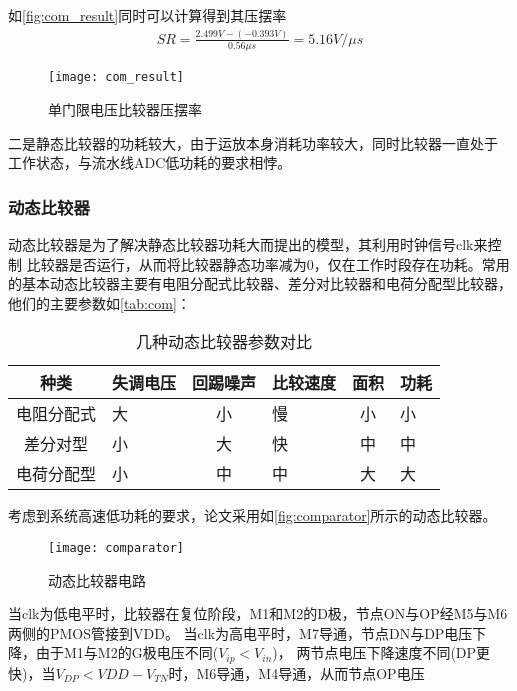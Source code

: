     \par 如\autoref{fig:com_result}同时可以计算得到其压摆率
    \begin{align}
        SR = \frac{2.499V-(-0.393V)}{0.56\mu s} = 5.16V/\mu s
    \end{align}
    \begin{figure}[H]
        \centering
        \texttt{[image: com\_result]}
        \caption{\label{fig:com_result}单门限电压比较器压摆率}
    \end{figure}

    \par 二是静态比较器的功耗较大，由于运放本身消耗功率较大，同时比较器一直处于
    工作状态，与流水线ADC低功耗的要求相悖。
    \subsubsection{动态比较器}
    动态比较器是为了解决静态比较器功耗大而提出的模型，其利用时钟信号clk来控制
    比较器是否运行，从而将比较器静态功率减为0，仅在工作时段存在功耗。常用
    的基本动态比较器主要有电阻分配式比较器、差分对比较器和电荷分配型比较器，
    他们的主要参数如\autoref{tab:com}：
    \begin{table}[ht]
        \caption{\label{tab:com}几种动态比较器参数对比}
        \begin{tabularx}{\linewidth}{|c|X<{\centering}|c|X<{\centering}|c|X<{\centering}|}
            \hline
            种类 & 失调电压 & 回踢噪声 & 比较速度 & 面积 & 功耗\\ \hline
            电阻分配式 & 大 & 小 & 慢 & 小 & 小\\ \hline
            差分对型 & 小 & 大 & 快 & 中 & 中\\ \hline
            电荷分配型 & 小 & 中 & 中 & 大 & 大\\ \hline
        \end{tabularx}
    \end{table}
    \par 考虑到系统高速低功耗的要求，论文采用如\autoref{fig:comparator}所示的动态比较器。
    \begin{figure}[H]
        \centering
        \texttt{[image: comparator]}
        \caption{\label{fig:comparator}动态比较器电路}
    \end{figure}
    \par 当clk为低电平时，比较器在复位阶段，M1和M2的D极，节点ON与OP经M5与M6两侧的PMOS管接到VDD。
    当clk为高电平时，M7导通，节点DN与DP电压下降，由于M1与M2的G极电压不同($ V_{ip} < V_{in} $)，
    两节点电压下降速度不同(DP更快)，当$ V_{DP} < VDD - V_{TN} $时，M6导通，M4导通，从而节点OP电压
